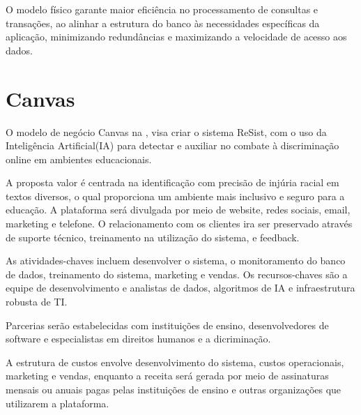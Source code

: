 \documentclass[
  a4paper,%
  12pt,%
  english,%
  brazilian,%
]{article}
\begin{document}
\clearpage

    O modelo físico garante maior eficiência no processamento de consultas e transações, ao alinhar a estrutura do banco às necessidades específicas da aplicação, minimizando redundâncias e maximizando a velocidade de acesso aos dados.
    \section*{Canvas}
    O modelo de negócio Canvas na , visa criar o sistema ReSist, com o uso da Inteligência Artificial(IA) para detectar e auxiliar no combate à discriminação online em ambientes educacionais.

    A proposta valor é centrada na identificação com precisão de injúria racial em textos diversos, o qual proporciona um ambiente mais inclusivo e seguro para a educação. A plataforma será divulgada por meio de website, redes sociais, email, marketing e telefone. \newline O relacionamento com os clientes ira ser preservado através de suporte técnico, treinamento na utilização do sistema, e feedback.

    As atividades-chaves incluem desenvolver o sistema, o monitoramento do banco de dados, treinamento do sistema, marketing e vendas. Os recursos-chaves são a equipe de desenvolvimento e analistas de dados, algoritmos de IA e infraestrutura robusta de TI. 

    Parcerias serão estabelecidas com instituições de ensino, desenvolvedores de software e especialistas em direitos humanos e a dicriminação.

    A estrutura de custos envolve desenvolvimento do sistema, custos operacionais, marketing e vendas, enquanto a receita será gerada por meio de assinaturas mensais ou anuais pagas pelas instituições de ensino e outras organizações que utilizarem a plataforma.
\end{document}
